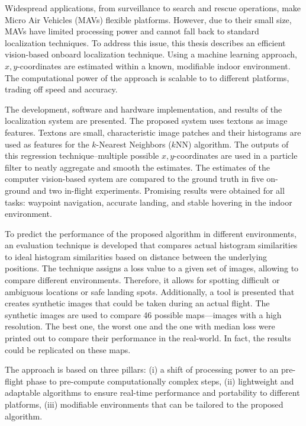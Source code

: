 Widespread applications, from surveillance to search and rescue operations, make Micro Air Vehicles (MAVs) flexible platforms.
However, due to their small size, MAVs have limited processing power and cannot
fall back to standard localization techniques. To address this
issue, this thesis describes an efficient vision-based onboard localization
technique. Using a machine
learning approach, $x,y$-coordinates are estimated within a known, modifiable indoor
environment. The computational power of the approach is scalable to to different platforms, trading off speed and accuracy.

The development, software and hardware
implementation, and results of the localization system are presented. The proposed system uses 
textons as image features. Textons are small, characteristic image patches and their histograms are used as features for the $k$-Nearest Neighbors ($k$NN)
algorithm. The outputs of this regression technique--multiple possible
$x, y$-coordinates are used in a particle filter to neatly aggregate
and smooth the estimates. The estimates of the computer vision-based
system are compared to the ground truth in five on-ground and two
in-flight experiments. Promising results were obtained for all tasks:
waypoint navigation, accurate landing, and stable hovering in the
indoor environment.

To predict the performance of the proposed algorithm in different environments, an evaluation
technique is developed that compares actual histogram similarities to
ideal histogram similarities based on distance between the underlying
positions. The technique assigns a loss value to a given set of
images, allowing to compare different environments. Therefore, it
allows for spotting difficult or ambiguous locations or safe landing
spots. Additionally, a tool is presented that creates synthetic images
that could be taken during an actual flight. The synthetic images are
used to compare 46 possible maps---images with a high resolution. The
best one, the worst one and the one with median loss were printed out
to compare their performance in the real-world. In fact, the results
could be replicated on these maps.

The approach is based on three pillars: (i) a shift of processing power to an pre-flight phase to pre-compute
computationally complex steps, (ii) lightweight and adaptable algorithms to ensure real-time performance and portability to different platforms,
(iii) modifiable environments that can be tailored to the proposed algorithm. 